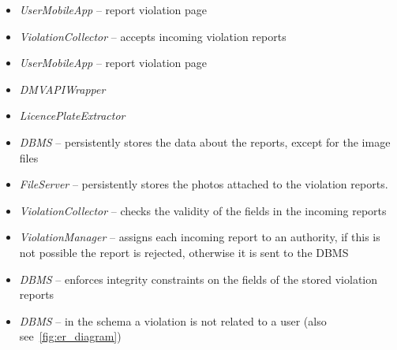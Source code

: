 \begin{description}
    \begin{itemize}
        \item \emph{UserMobileApp} -- report violation page
        \item \emph{ViolationCollector} -- accepts incoming violation reports
    \end{itemize}

    \begin{itemize}
        \item \emph{UserMobileApp} -- report violation page
    \end{itemize}

    \begin{itemize}
        \item \emph{DMVAPIWrapper}
    \end{itemize}

    \begin{itemize}
        \item \emph{LicencePlateExtractor}
    \end{itemize}

    \begin{itemize}
        \item \emph{DBMS} -- persistently stores the data about the reports,
        except for the image files
        \item \emph{FileServer} -- persistently stores the photos attached to
        the violation reports.
    \end{itemize}

    \begin{itemize}
        \item \emph{ViolationCollector} -- checks the validity of the fields
        in the incoming reports
        \item  \emph{ViolationManager} -- assigns each incoming report to an
        authority, if this is not possible the report is rejected, otherwise it
        is sent to the DBMS
        \item \emph{DBMS} -- enforces integrity constraints on the fields of the
        stored violation reports
    \end{itemize}

    \begin{itemize}
        \item \emph{DBMS} -- in the schema a violation is not related to a user
        (also see~\ref{fig:er_diagram})
    \end{itemize}


\end{description}
